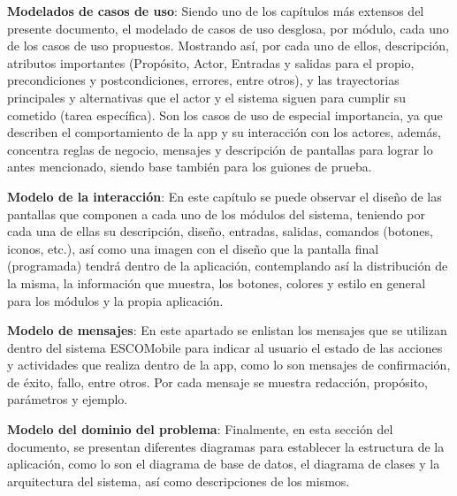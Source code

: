 \noindent
\textbf{Modelados de casos de uso}: Siendo uno de los capítulos más extensos del presente documento, el modelado de casos de uso desglosa, por módulo, cada uno de los casos de uso propuestos. Mostrando así, por cada uno de ellos, descripción, atributos importantes (Propósito, Actor, Entradas y salidas para el propio, precondiciones y postcondiciones, errores, entre otros), y las trayectorias principales y alternativas que el actor y el sistema siguen para cumplir su cometido (tarea específica).
Son los casos de uso de especial importancia, ya que describen el comportamiento de la app y su interacción con los actores, además, concentra reglas de negocio, mensajes y descripción de pantallas para lograr lo antes mencionado, siendo base también para los guiones de prueba.
\newline

\noindent
\textbf{Modelo de la interacción}: En este capítulo se puede observar el diseño de las pantallas que componen a cada uno de los módulos del sistema, teniendo por cada una de ellas su descripción, diseño, entradas, salidas, comandos (botones, iconos, etc.), así como una imagen con el diseño que la pantalla final (programada) tendrá dentro de la aplicación, contemplando así la distribución de la misma, la información que muestra, los botones, colores y estilo en general para los módulos y la propia aplicación. 
\newline

\noindent
\textbf{Modelo de mensajes}: En este apartado se enlistan los mensajes que se utilizan dentro del sistema ESCOMobile para indicar al usuario el estado de las acciones y actividades que realiza dentro de la app, como lo son mensajes de confirmación, de éxito, fallo, entre otros. Por cada mensaje se muestra redacción, propósito, parámetros y ejemplo.
\newline

\noindent
\textbf{Modelo del dominio del problema}: Finalmente, en esta sección del documento, se presentan diferentes diagramas para establecer la estructura de la aplicación, como lo son el diagrama de base de datos, el diagrama de clases y la arquitectura del sistema, así como descripciones de los mismos.
\newline
